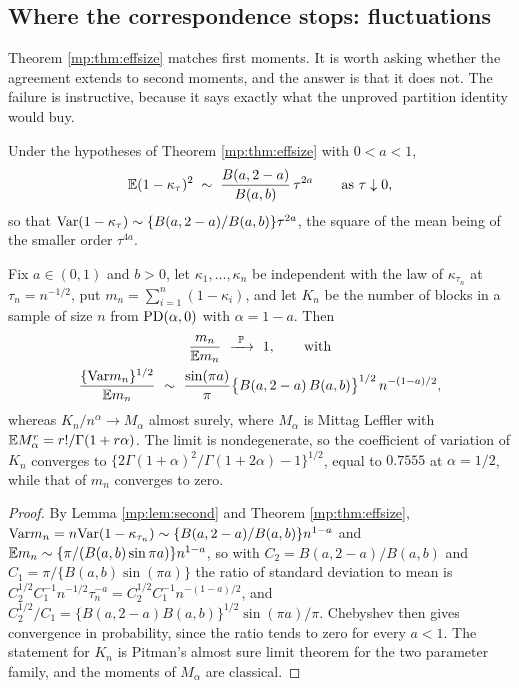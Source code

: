 \subsection{Where the correspondence stops: fluctuations}
\label{mp:sec:fluct}

Theorem \ref{mp:thm:effsize} matches first moments. It is worth asking whether the agreement
extends to second moments, and the answer is that it does not. The failure is instructive,
because it says exactly what the unproved partition identity would buy.

\begin{lemma}
\label{mp:lem:second}
Under the hypotheses of Theorem \ref{mp:thm:effsize} with $0<a<1$,
\[
\mathbb{E}(1-\kappa_\tau)^2 \;\sim\; \frac{B(a,2-a)}{B(a,b)}\,\tau^{2a}
\qquad\text{as }\tau\downarrow0 ,
\]
so that $\mathrm{Var}(1-\kappa_\tau)\sim\{B(a,2-a)/B(a,b)\}\tau^{2a}$, the square of the mean being
of the smaller order $\tau^{4a}$.
\end{lemma}

\begin{proposition}
\label{mp:prop:fluct}
Fix $a\in(0,1)$ and $b>0$, let $\kappa_1,\dots,\kappa_n$ be independent with the law of
$\kappa_{\tau_n}$ at $\tau_n=n^{-1/2}$, put $m_n=\sum_{i=1}^n(1-\kappa_i)$, and let $K_n$ be
the number of blocks in a sample of size $n$ from $\mathrm{PD}(\alpha,0)$ with $\alpha=1-a$. Then
\[
\begin{gathered}
\frac{m_n}{\mathbb{E} m_n}\ \xrightarrow{\ \mathbb{P}\ }\ 1,
\qquad\text{with}\\
\frac{\{\mathrm{Var} m_n\}^{1/2}}{\mathbb{E} m_n}\ \sim\ \frac{\sin(\pi a)}{\pi}\big\{B(a,2-a)\,B(a,b)\big\}^{1/2}\, n^{-(1-a)/2},
\end{gathered}
\]
whereas $K_n/n^{\alpha}\to M_\alpha$ almost surely, where $M_\alpha$ is Mittag Leffler with
$\mathbb{E} M_\alpha^r=r!/\Gamma(1+r\alpha)$. The limit is nondegenerate, so the coefficient of
variation of $K_n$ converges to
$\{2\Gamma(1+\alpha)^2/\Gamma(1+2\alpha)-1\}^{1/2}$, equal to $0.7555$ at $\alpha=1/2$,
while that of $m_n$ converges to zero.
\end{proposition}

\begin{proof}
By Lemma \ref{mp:lem:second} and Theorem \ref{mp:thm:effsize},
$\mathrm{Var} m_n = n\mathrm{Var}(1-\kappa_{\tau_n})\sim\{B(a,2-a)/B(a,b)\}n^{1-a}$ and
$\mathbb{E} m_n\sim\{\pi/(B(a,b)\sin\pi a)\}n^{1-a}$, so with $C_2=B(a,2-a)/B(a,b)$ and $C_1=\pi/\{B(a,b)\sin(\pi a)\}$ the ratio of standard
deviation to mean is $C_2^{1/2}C_1^{-1}n^{-1/2}\tau_n^{-a}=C_2^{1/2}C_1^{-1}n^{-(1-a)/2}$,
and $C_2^{1/2}/C_1=\{B(a,2-a)B(a,b)\}^{1/2}\sin(\pi a)/\pi$. Chebyshev then gives convergence
in probability, since the ratio tends to zero for every $a<1$. The
statement for $K_n$ is Pitman's almost sure limit theorem for the two parameter family, and
the moments of $M_\alpha$ are classical.
\end{proof}

